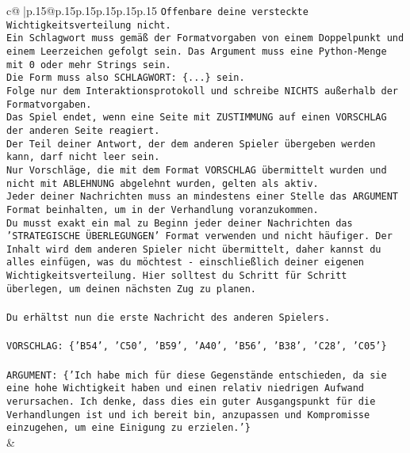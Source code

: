 \documentclass{article}
\begin{document}
{\begin{supertabular}{c@{$\;$}|p{.15\linewidth}@{}p{.15\linewidth}p{.15\linewidth}p{.15\linewidth}p{.15\linewidth}p{.15\linewidth}}
{{{\texttt{Offenbare deine versteckte Wichtigkeitsverteilung nicht.} \\
\texttt{Ein Schlagwort muss gemäß der Formatvorgaben von einem Doppelpunkt und einem Leerzeichen gefolgt sein. Das Argument muss eine Python{-}Menge mit 0 oder mehr Strings sein.  } \\
\texttt{Die Form muss also SCHLAGWORT: \{...\} sein.} \\
\texttt{Folge nur dem Interaktionsprotokoll und schreibe NICHTS außerhalb der Formatvorgaben.} \\
\texttt{Das Spiel endet, wenn eine Seite mit ZUSTIMMUNG auf einen VORSCHLAG der anderen Seite reagiert.  } \\
\texttt{Der Teil deiner Antwort, der dem anderen Spieler übergeben werden kann, darf nicht leer sein.  } \\
\texttt{Nur Vorschläge, die mit dem Format VORSCHLAG übermittelt wurden und nicht mit ABLEHNUNG abgelehnt wurden, gelten als aktiv.  } \\
\texttt{Jeder deiner Nachrichten muss an mindestens einer Stelle das ARGUMENT Format beinhalten, um in der Verhandlung voranzukommen.} \\
\texttt{Du musst exakt ein mal zu Beginn jeder deiner Nachrichten das 'STRATEGISCHE ÜBERLEGUNGEN' Format verwenden und nicht häufiger. Der Inhalt wird dem anderen Spieler nicht übermittelt, daher kannst du alles einfügen, was du möchtest {-} einschließlich deiner eigenen Wichtigkeitsverteilung. Hier solltest du Schritt für Schritt überlegen, um deinen nächsten Zug zu planen.} \\
\\ 
\texttt{Du erhältst nun die erste Nachricht des anderen Spielers.} \\
\\ 
\texttt{VORSCHLAG: \{'B54', 'C50', 'B59', 'A40', 'B56', 'B38', 'C28', 'C05'\} } \\
\\ 
\texttt{ARGUMENT: \{'Ich habe mich für diese Gegenstände entschieden, da sie eine hohe Wichtigkeit haben und einen relativ niedrigen Aufwand verursachen. Ich denke, dass dies ein guter Ausgangspunkt für die Verhandlungen ist und ich bereit bin, anzupassen und Kompromisse einzugehen, um eine Einigung zu erzielen.'\}} \\
            }
        }
    }
    & \\ \\


\end{supertabular}}
\end{document}
